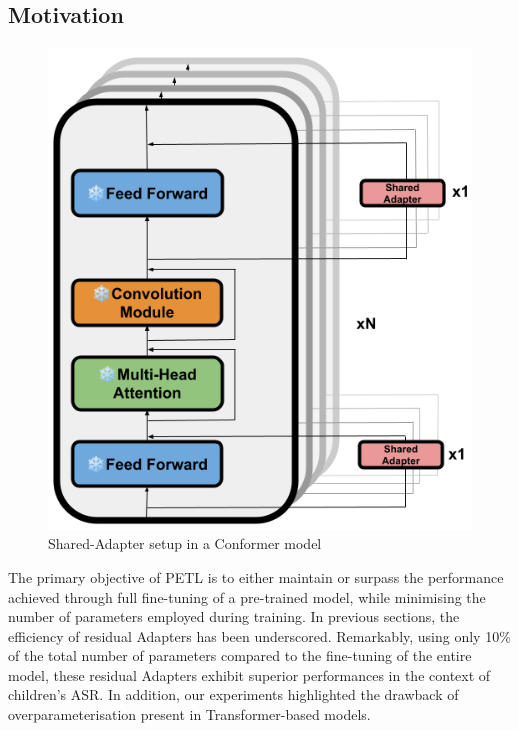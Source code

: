 \subsection{Motivation}
\begin{figure}
    \begin{center}
        \includegraphics[scale=0.3]{imgs/Shared_Adapters.png}
        \caption{Shared-Adapter setup in a Conformer model}
        \label{fig:Shared_adapter}
    \end{center}
\end{figure}

The primary objective of PETL is to either maintain or surpass the performance achieved through full fine-tuning of a pre-trained model, while minimising the number of parameters employed during training. In previous sections, the efficiency of residual Adapters has been underscored. Remarkably, using only 10\% of the total number of parameters compared to the fine-tuning of the entire model, these residual Adapters exhibit superior performances in the context of children's ASR. In addition, our experiments highlighted the drawback of overparameterisation present in Transformer-based models.

